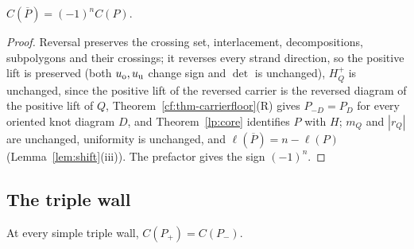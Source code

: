 \begin{proposition}[reversal]\label{prop:C-reversal}
$C(\overline P)=(-1)^nC(P)$. 
\end{proposition}
\begin{proof}
Reversal preserves the crossing set, interlacement, decompositions,
subpolygons and their crossings; it reverses every strand direction, so the
positive lift is preserved (both $u_{\rm o},u_{\rm u}$ change sign and
$\det$ is unchanged), $H^+_Q$ is unchanged, since the positive lift of the
reversed carrier is the reversed diagram of the positive lift of $Q$,
Theorem~\ref{cf:thm-carrierfloor}(R) gives $P_{-D}=P_D$ for every oriented
knot diagram $D$, and Theorem~\ref{lp:core} identifies $P$ with $H$; $m_Q$
and $|r_Q|$ are unchanged,
uniformity is unchanged, and $\ell(\overline P)=n-\ell(P)$
(Lemma~\ref{lem:shift}(iii)). The prefactor gives the sign $(-1)^n$.
\end{proof}

\subsection{The triple wall}

\begin{hypothesis}[R]\label{hyp:R}
At every simple triple wall, $C(P_+)=C(P_-)$. 
\end{hypothesis}

